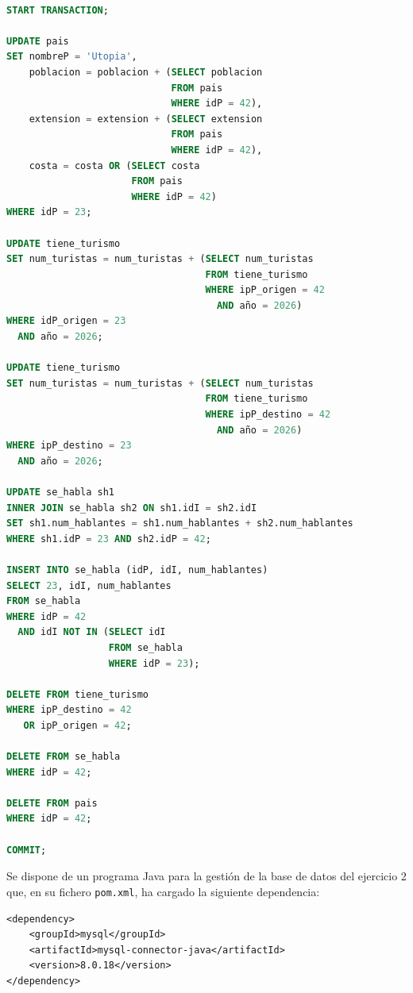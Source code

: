 \documentclass[
    12pt,
    a4paper,
    addpoints,
    answers,
    convocatoria=ord,
    titulacion=NoCD,
    curso=2025/2026,
]{db-exam}
\begin{document}
\begin{questions}
\begin{solution}[50em]
\begin{lstlisting}[language=SQL]

START TRANSACTION;

UPDATE pais
SET nombreP = 'Utopia',
    poblacion = poblacion + (SELECT poblacion
                             FROM pais
                             WHERE idP = 42),
    extension = extension + (SELECT extension
                             FROM pais
                             WHERE idP = 42),
    costa = costa OR (SELECT costa
                      FROM pais
                      WHERE idP = 42)
WHERE idP = 23;

UPDATE tiene_turismo
SET num_turistas = num_turistas + (SELECT num_turistas 
                                   FROM tiene_turismo 
                                   WHERE ipP_origen = 42
                                     AND año = 2026)
WHERE idP_origen = 23
  AND año = 2026;

UPDATE tiene_turismo
SET num_turistas = num_turistas + (SELECT num_turistas 
                                   FROM tiene_turismo 
                                   WHERE ipP_destino = 42
                                     AND año = 2026)
WHERE ipP_destino = 23
  AND año = 2026;

UPDATE se_habla sh1
INNER JOIN se_habla sh2 ON sh1.idI = sh2.idI
SET sh1.num_hablantes = sh1.num_hablantes + sh2.num_hablantes
WHERE sh1.idP = 23 AND sh2.idP = 42;

INSERT INTO se_habla (idP, idI, num_hablantes)
SELECT 23, idI, num_hablantes
FROM se_habla
WHERE idP = 42
  AND idI NOT IN (SELECT idI
                  FROM se_habla
                  WHERE idP = 23);

DELETE FROM tiene_turismo
WHERE ipP_destino = 42 
   OR ipP_origen = 42;

DELETE FROM se_habla
WHERE idP = 42;

DELETE FROM pais
WHERE idP = 42;

COMMIT;

\end{lstlisting}       
\end{solution}

\newpage

\question[1] Se dispone de un programa Java para la gestión de la base de datos del ejercicio 2 que, en su fichero \texttt{pom.xml}, ha cargado la siguiente dependencia:

\begin{verbatim}
<dependency>
    <groupId>mysql</groupId>
    <artifactId>mysql-connector-java</artifactId>
    <version>8.0.18</version>
</dependency>
\end{verbatim}


\end{questions}
\end{document}

